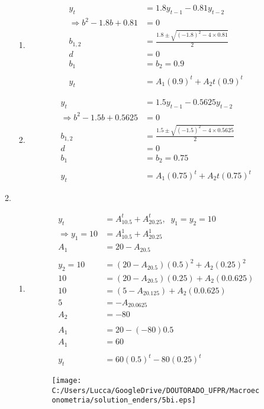 \begin{enumerate}
\begin{enumerate}
\begin{enumerate}
	\item %
	\begin{align*}
		y_t&=1.8y_{t-1}-0.81y_{t-2}\\
		\Rightarrow b^2-1.8b+0.81&=0\\
		b_{1,2}&=\frac{1.8\pm\sqrt{(-1.8)^2-4\times 0.81}}{2}\\
		d&=0\\
		b_1&=b_2=0.9\\
		\\
		y_t&=A_1(0.9)^t+A_2t(0.9)^t
	\end{align*}
	
	\item %
	\begin{align*}
		y_t&=1.5y_{t-1}-0.5625y_{t-2}\\
		\Rightarrow b^2-1.5b+0.5625&=0\\
		b_{1,2}&=\frac{1.5\pm \sqrt{(-1.5)^2-4\times 0.5625}}{2}\\
		d&=0\\
		b_1&=b_2=0.75\\
		\\
		y_t&=A_1(0.75)^t+A_2t(0.75)^t
	\end{align*}
\end{enumerate}
	
	\item %
	\begin{enumerate}
		\item %
	
	\begin{align*}
		y_t&=A_10.5^t+A_20.25^t,\;\;y_1=y_2=10\\
		\Rightarrow y_1=10&=A_10.5^1+A_20.25^1\\
		A_1&=20-A_20.5\\
		\\
		y_2=10&=(20-A_20.5)(0.5)^2+A_2(0.25)^2\\
		10&=(20-A_20.5)(0.25)+A_2(0.0.625)\\
		10&=(5-A_20.125)+A_2(0.0.625)\\
		5&=-A_20.0625\\
		A_2&=-80\\
		\\
		A_1&=20-(-80)0.5\\
		A_1&=60\\
		\\
		y_t&=60(0.5)^t-80(0.25)^t
	\end{align*}
	
	\begin{figure}[h]
		\centering
		\texttt{[image: C:/Users/Lucca/GoogleDrive/DOUTORADO\_UFPR/Macroeconometria/solution\_enders/5bi.eps]}
	\end{figure}
	

\end{enumerate}
\end{enumerate}
\end{enumerate}

